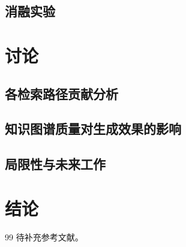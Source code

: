 \documentclass[12pt, a4paper]{article}
\begin{document}
\subsection{消融实验}



\section{讨论}

\subsection{各检索路径贡献分析}

\subsection{知识图谱质量对生成效果的影响}

\subsection{局限性与未来工作}



\section{结论}




% 
% 

\begin{thebibliography}{99}
 待补充参考文献。
\end{thebibliography}
\end{document}
